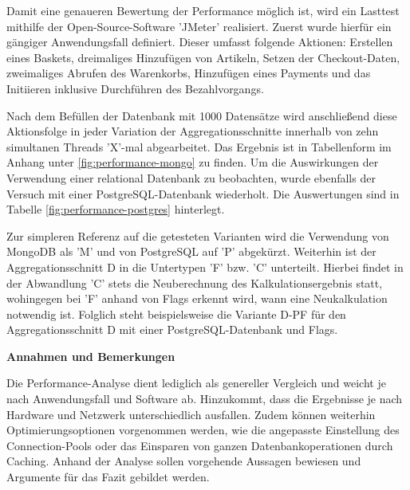 Damit eine genaueren Bewertung der Performance möglich ist, wird ein Lasttest mithilfe der Open-Source-Software 'JMeter' realisiert. Zuerst wurde hierfür ein gängiger Anwendungsfall definiert. Dieser umfasst folgende Aktionen: Erstellen eines Baskets, dreimaliges Hinzufügen von Artikeln, Setzen der Checkout-Daten, zweimaliges Abrufen des Warenkorbs, Hinzufügen eines Payments und das Initiieren inklusive Durchführen des Bezahlvorgangs.

Nach dem Befüllen der Datenbank mit 1000 Datensätze wird anschließend diese Aktionsfolge in jeder Variation der Aggregationsschnitte innerhalb von zehn simultanen Threads 'X'-mal abgearbeitet. Das Ergebnis ist in Tabellenform im Anhang unter \ref{fig:performance-mongo} zu finden. Um die Auswirkungen der Verwendung einer relational Datenbank zu beobachten, wurde ebenfalls der Versuch mit einer PostgreSQL-Datenbank wiederholt. Die Auswertungen sind in Tabelle \ref{fig:performance-postgres} hinterlegt. 

Zur simpleren Referenz auf die getesteten Varianten wird die Verwendung von MongoDB als 'M' und von PostgreSQL auf 'P' abgekürzt. Weiterhin ist der Aggregationsschnitt D in die Untertypen 'F' bzw. 'C' unterteilt. Hierbei findet in der Abwandlung 'C' stets die Neuberechnung des Kalkulationsergebnis statt, wohingegen bei 'F' anhand von Flags erkennt wird, wann eine Neukalkulation notwendig ist. Folglich steht beispielsweise die Variante D-PF für den Aggregationsschnitt D mit einer PostgreSQL-Datenbank und Flags.

\textbf{Annahmen und Bemerkungen}


Die Performance-Analyse dient lediglich als genereller Vergleich und weicht je nach Anwendungsfall und Software ab. Hinzukommt, dass die Ergebnisse je nach Hardware und Netzwerk unterschiedlich ausfallen. Zudem können weiterhin Optimierungsoptionen vorgenommen werden, wie die angepasste Einstellung des Connection-Pools oder das Einsparen von ganzen Datenbankoperationen durch Caching. Anhand der Analyse sollen vorgehende Aussagen bewiesen und Argumente für das Fazit gebildet werden.

